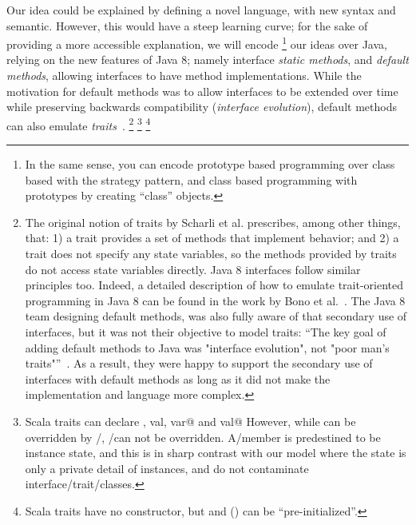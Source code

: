 Our idea could be explained by defining a novel language, with new
syntax and semantic.  However, this would have a steep learning curve;
for the sake of providing a more accessible explanation, we will
encode \footnote{ In the same sense, you can encode prototype based
  programming over class based with the strategy pattern, and class
  based programming with prototypes by creating ``class'' objects.  }
our ideas over Java, relying on the new features of Java 8; namely
interface \emph{static methods}, and \emph{default methods}, allowing
interfaces to have method implementations. While the motivation for
default methods was to allow interfaces to be extended over time while
preserving backwards compatibility (\emph{interface evolution}),
default methods can also emulate \emph{traits}~\cite{scharli03traits}.
\footnote{The original notion of traits by Scharli et al. prescribes,
  among other things, that: 1) a trait provides a set of methods that
  implement behavior; and 2) a trait does not specify any state
  variables, so the methods provided by traits do not access state
  variables directly. Java 8 interfaces follow similar principles
  too. Indeed, a detailed description of how to emulate trait-oriented
  programming in Java 8 can be found in the work by Bono et
  al.~\cite{bono14}. The Java 8 team designing default methods, was
  also fully aware of that secondary use of interfaces, but it was not
  their objective to model traits: ``The key goal of adding default
  methods to Java was "interface evolution", not "poor man's
  traits"''~\cite{goetz13default}. As a result, they were happy to
  support the secondary use of interfaces with default methods as long
  as it did not make the implementation and language more complex.}
  \footnote{  Scala traits can declare \Q@def, val, var@ and
  \Q@lazy val@ However, while \Q@def@s can be overridden by
  \Q@val@/\Q@var@s, \Q@val@/\Q@var@s can not be overridden. A\Q@val@/\Q@var@ member is predestined to be
  instance state, and this is in sharp contrast with our model where
  the state is only a private detail of instances, and do not
  contaminate interface/trait/classes.}  \footnote{Scala traits have
  no constructor, but \Q@var@s and (\Q@lazy@) \Q@val@s can be
  ``pre-initialized''.}






